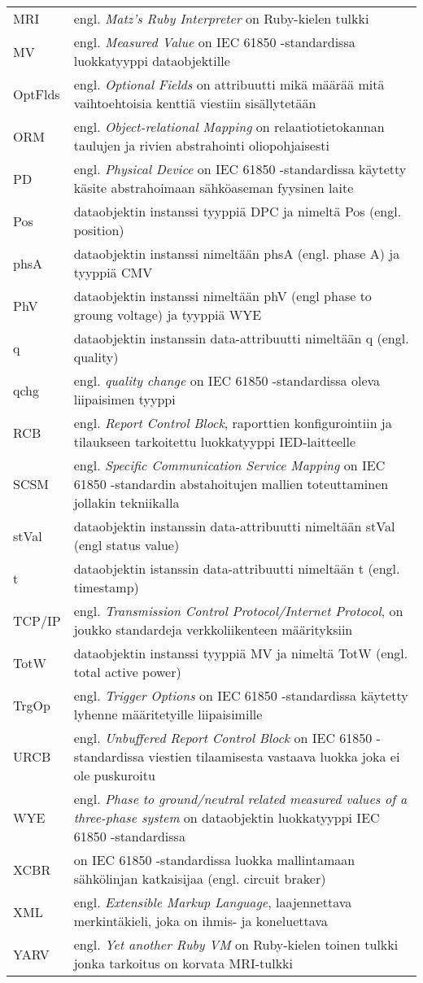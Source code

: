 \begin{tabularx}{\linewidth}[h]{@{} p{} p{} @{}}
	MRI & engl. \emph{Matz’s Ruby Interpreter} on Ruby-kielen tulkki \\
	MV & engl. \emph{Measured Value} on IEC 61850 -standardissa luokkatyyppi dataobjektille \\
	OptFlds & engl. \emph{Optional Fields} on attribuutti mikä määrää mitä vaihtoehtoisia kenttiä viestiin sisällytetään \\
	ORM & engl. \emph{Object-relational Mapping} on relaatiotietokannan taulujen ja rivien abstrahointi oliopohjaisesti \\
	PD & engl. \emph{Physical Device} on IEC 61850 -standardissa käytetty käsite abstrahoimaan sähköaseman fyysinen laite \\
	Pos & dataobjektin instanssi tyyppiä DPC ja nimeltä Pos (engl. position) \\
	phsA & dataobjektin instanssi nimeltään phsA (engl. phase A) ja tyyppiä CMV \\
	PhV & dataobjektin instanssi nimeltään phV (engl phase to groung voltage) ja tyyppiä WYE \\
	q & dataobjektin instanssin data-attribuutti nimeltään q (engl. quality) \\
	qchg & engl. \emph{quality change} on IEC 61850 -standardissa oleva liipaisimen tyyppi \\
	RCB & engl. \emph{Report Control Block}, raporttien konfigurointiin ja tilaukseen tarkoitettu luokkatyyppi IED-laitteelle \\
	SCSM & engl. \emph{Specific Communication Service Mapping} on IEC 61850 -standardin abstahoitujen mallien toteuttaminen jollakin tekniikalla \\
	stVal & dataobjektin instanssin data-attribuutti nimeltään stVal (engl status value) \\
	t & dataobjektin istanssin data-attribuutti nimeltään t (engl. timestamp) \\
	TCP/IP & engl. \emph{Transmission Control Protocol/Internet Protocol}, on joukko standardeja verkkoliikenteen määrityksiin \\
	TotW & dataobjektin instanssi tyyppiä MV ja nimeltä TotW (engl. total active power) \\
	TrgOp & engl. \emph{Trigger Options} on IEC 61850 -standardissa käytetty lyhenne määritetyille liipaisimille \\
	URCB & engl. \emph{Unbuffered Report Control Block} on IEC 61850 -standardissa viestien tilaamisesta vastaava luokka joka ei ole puskuroitu \\
	WYE & engl. \emph{Phase to ground/neutral related measured values of a three-phase system} on dataobjektin luokkatyyppi IEC 61850 -standardissa \\
	XCBR & on IEC 61850 -standardissa luokka mallintamaan sähkölinjan katkaisijaa (engl. circuit braker) \\
	XML & engl. \emph{Extensible Markup Language}, laajennettava merkintäkieli, joka on ihmis- ja koneluettava \\
	YARV & engl. \emph{Yet another Ruby VM} on Ruby-kielen toinen tulkki jonka tarkoitus on korvata MRI-tulkki \\
\end{tabularx}